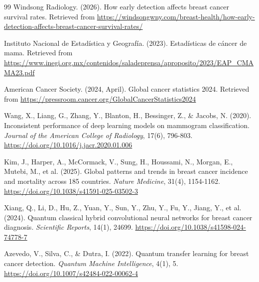 \begin{thebibliography}{99}
    Windsong Radiology. (2026). How early detection affects breast cancer survival rates.
    Retrieved from \url{https://windsongwny.com/breast-health/how-early-detection-affects-breast-cancer-survival-rates/}

    Instituto Nacional de Estadística y Geografía. (2023). Estadísticas de cáncer de mama.
    Retrieved from \url{https://www.inegi.org.mx/contenidos/saladeprensa/aproposito/2023/EAP_CMAMA23.pdf}

    American Cancer Society. (2024, April). Global cancer statistics 2024. Retrieved from
    \url{https://pressroom.cancer.org/GlobalCancerStatistics2024}

    Wang, X., Liang, G., Zhang, Y., Blanton, H., Bessinger, Z., \& Jacobs, N. (2020).
    Inconsistent performance of deep learning models on mammogram classification.
    \textit{Journal of the American College of Radiology}, 17(6), 796-803.
    \url{https://doi.org/10.1016/j.jacr.2020.01.006}

    Kim, J., Harper, A., McCormack, V., Sung, H., Houssami, N., Morgan, E., Mutebi, M.,
    et al. (2025). Global patterns and trends in breast cancer incidence and mortality
    across 185 countries. \textit{Nature Medicine}, 31(4), 1154-1162.
    \url{https://doi.org/10.1038/s41591-025-03502-3}

    Xiang, Q., Li, D., Hu, Z., Yuan, Y., Sun, Y., Zhu, Y., Fu, Y., Jiang, Y., et al. (2024).
    Quantum classical hybrid convolutional neural networks for breast cancer diagnosis.
    \textit{Scientific Reports}, 14(1), 24699.
    \url{https://doi.org/10.1038/s41598-024-74778-7}

    Azevedo, V., Silva, C., \& Dutra, I. (2022). Quantum transfer learning for breast
    cancer detection. \textit{Quantum Machine Intelligence}, 4(1), 5.
    \url{https://doi.org/10.1007/s42484-022-00062-4}


\end{thebibliography}
